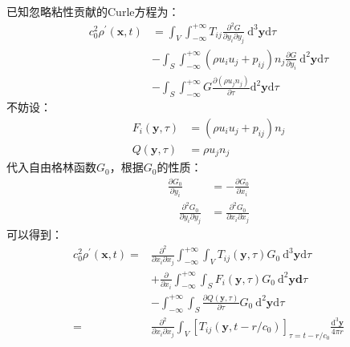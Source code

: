 \begin{enumerate}
        已知忽略粘性贡献的Curle方程为：
        \begin{equation}
            \begin{aligned}
                c_{0}^{2} \rho^{\prime}(\mathbf{x}, t) 
                &=\int_{V} \int_{-\infty}^{+\infty} T_{i j} \frac{\partial^{2} G}{\partial y_{i} \partial y_{j}} \mathrm{~d}^{3} \mathbf{y} \mathrm{d} \tau \\
                &-\int_{S} \int_{-\infty}^{+\infty}\left(\rho u_{i} u_{j}+p_{i j}\right) n_{j} \frac{\partial G}{\partial y_{i}} \mathrm{~d}^{2} \mathbf{y} \mathrm{d} \tau \\
                &-\int_{S} \int_{-\infty}^{+\infty} G \frac{\partial\left(\rho u_{j} n_{j}\right)}{\partial \tau} \mathrm{d}^{2} \mathbf{y} \mathrm{d} \tau
            \end{aligned}
        \end{equation}
        不妨设：
        \begin{align}
            F_{i}(\mathbf{y}, \tau)
            &=\left(\rho u_{i} u_{j}+p_{i j}\right) n_{j} \\
            Q(\mathbf{y}, \tau)
            &=\rho u_{j} n_{j}
        \end{align}
        代入自由格林函数$G_{0}$，根据$G_{0}$的性质：
        \begin{align}
            \frac{\partial G_{0}}{\partial y_{i}}
            &= -\frac{\partial G_{0}}{\partial x_{i}} \\
            \quad \frac{\partial^{2} G_{0}}{\partial y_{i} \partial y_{j}}
            &= \frac{\partial^{2} G_{0}}{\partial x_{i} \partial x_{j}}
        \end{align}
        可以得到：
        \begin{equation}
            \begin{aligned}
                c_{0}^{2} \rho^{\prime}(\mathbf{x}, t) 
                =&\frac{\partial^{2}}{\partial x_{i} \partial x_{j}} \int_{-\infty}^{+\infty} \int_{V} T_{i j}(\mathbf{y}, \tau) G_{0} \mathrm{~d}^{3} \mathbf{y} \mathrm{d} \tau \\
                &+\frac{\partial}{\partial x_{i}} \int_{-\infty}^{+\infty} \int_{S} F_{i}(\mathbf{y}, \tau) G_{0} \mathrm{~d}^{2} \mathbf{y d} \tau \\
                &-\int_{-\infty}^{+\infty} \int_{S} \frac{\partial Q(\mathbf{y}, \tau)}{\partial \tau} G_{0} \mathrm{~d}^{2} \mathbf{y} \mathrm{d} \tau \\
                =&\frac{\partial^{2}}{\partial x_{i} \partial x_{j}} \int_{V}\left[T_{i j}\left(\mathbf{y}, t-r / c_{0}\right)\right]_{\tau=t-r / c_{0}} \frac{\mathrm{d}^{3} \mathbf{y}}{4 \pi r} \\

\end{aligned}
\end{equation}
\end{enumerate}
